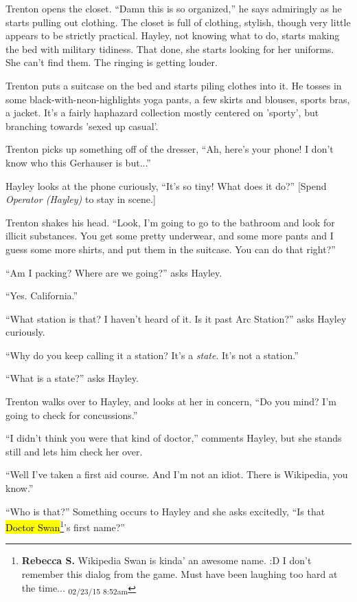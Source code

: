 Trenton opens the closet.  ``Damn this is so organized,'' he says admiringly as he starts pulling out clothing. The closet is full of clothing, stylish, though very little appears to be strictly practical.  Hayley, not knowing what to do, starts making the bed with military tidiness.  That done, she starts looking for her uniforms.  She can't find them. The ringing is getting louder.

Trenton puts a suitcase on the bed and starts piling clothes into it.  He tosses in some black-with-neon-highlights yoga pants, a few skirts and blouses, sports bras, a jacket. It's a fairly haphazard collection mostly centered on 'sporty', but branching towards 'sexed up casual'. 



Trenton picks up something off of the dresser, ``Ah, here's your phone!  I don't know who this Gerhauser is but...'' 

Hayley looks at the phone curiously, ``It's so tiny!  What does it do?''  {[}Spend \textit{Operator (Hayley)} to stay in scene.{]}

Trenton shakes his head.  ``Look, I'm going to go to the bathroom and look for illicit substances.  You get some pretty underwear, and some more pants and I guess some more shirts, and put them in the suitcase.  You can do that right?''

``Am I packing?  Where are we going?'' asks Hayley.

``Yes. California.''

``What station is that?  I haven't heard of it.  Is it past Arc Station?'' asks Hayley curiously.

``Why do you keep calling it a station?  It's a \textit{state}.  It's not a station.''

``What is a state?'' asks Hayley.

Trenton walks over to Hayley, and looks at her in concern, ``Do you mind?  I'm going to check for concussions.''

``I didn't think you were that kind of doctor,'' comments Hayley, but she stands still and lets him check her over.

``Well I've taken a first aid course. And I'm not an idiot. There is Wikipedia, you know.''

``Who is that?''  Something occurs to Hayley and she asks excitedly, ``Is that \hl{Doctor Swan}\footnote{\textbf{Rebecca S. }Wikipedia Swan is kinda' an awesome name.  :D
I don't remember this dialog from the game. Must have been laughing too hard at the time... \textsubscript{02/23/15 8:52am}}'s first name?''

